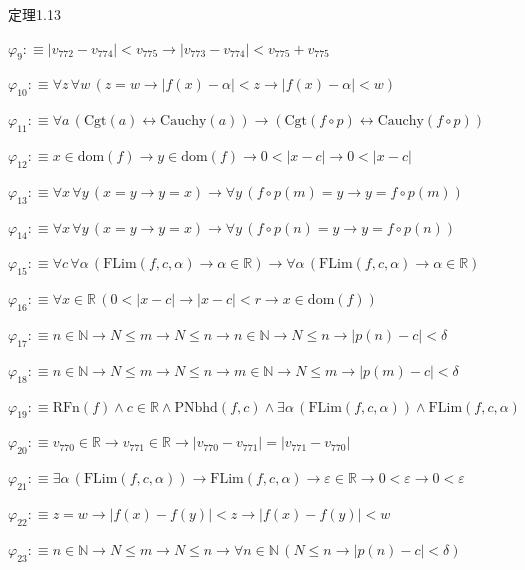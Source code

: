 \begin{fullproof}{定理1.13}
\begin{abbrevlist}
\item $\varphi_{9} :\equiv \lvert v_{772} - v_{774} \rvert < v_{775} \to \lvert v_{773} - v_{774} \rvert < v_{775} + v_{775}$
\item $\varphi_{10} :\equiv \forall z\,\forall w\,(z = w \to \lvert f(x) - \alpha \rvert < z \to \lvert f(x) - \alpha \rvert < w)$
\item $\varphi_{11} :\equiv \forall a\,(\mathrm{Cgt}(a) \leftrightarrow \mathrm{Cauchy}(a)) \to (\mathrm{Cgt}(f \circ p) \leftrightarrow \mathrm{Cauchy}(f \circ p))$
\item $\varphi_{12} :\equiv x \in \mathrm{dom}(f) \to y \in \mathrm{dom}(f) \to 0 < \lvert x - c \rvert \to 0 < \lvert x - c \rvert$
\item $\varphi_{13} :\equiv \forall x\,\forall y\,(x = y \to y = x) \to \forall y\,(f \circ p(m) = y \to y = f \circ p(m))$
\item $\varphi_{14} :\equiv \forall x\,\forall y\,(x = y \to y = x) \to \forall y\,(f \circ p(n) = y \to y = f \circ p(n))$
\item $\varphi_{15} :\equiv \forall c\,\forall \alpha\,(\mathrm{FLim}(f,c,\alpha) \to \alpha \in \mathbb{R}) \to \forall \alpha\,(\mathrm{FLim}(f,c,\alpha) \to \alpha \in \mathbb{R})$
\item $\varphi_{16} :\equiv \forall x \in \mathbb{R}\,(0 < \lvert x - c \rvert \to \lvert x - c \rvert < r \to x \in \mathrm{dom}(f))$
\item $\varphi_{17} :\equiv n \in \mathbb{N} \to N \leq m \to N \leq n \to n \in \mathbb{N} \to N \leq n \to \lvert p(n) - c \rvert < \delta$
\item $\varphi_{18} :\equiv n \in \mathbb{N} \to N \leq m \to N \leq n \to m \in \mathbb{N} \to N \leq m \to \lvert p(m) - c \rvert < \delta$
\item $\varphi_{19} :\equiv \mathrm{RFn}(f) \land c \in \mathbb{R} \land \mathrm{PNbhd}(f,c) \land \exists \alpha\,(\mathrm{FLim}(f,c,\alpha)) \land \mathrm{FLim}(f,c,\alpha)$
\item $\varphi_{20} :\equiv v_{770} \in \mathbb{R} \to v_{771} \in \mathbb{R} \to \lvert v_{770} - v_{771} \rvert = \lvert v_{771} - v_{770} \rvert$
\item $\varphi_{21} :\equiv \exists \alpha\,(\mathrm{FLim}(f,c,\alpha)) \to \mathrm{FLim}(f,c,\alpha) \to \varepsilon \in \mathbb{R} \to 0 < \varepsilon \to 0 < \varepsilon$
\item $\varphi_{22} :\equiv z = w \to \lvert f(x) - f(y) \rvert < z \to \lvert f(x) - f(y) \rvert < w$
\item $\varphi_{23} :\equiv n \in \mathbb{N} \to N \leq m \to N \leq n \to \forall n \in \mathbb{N}\,(N \leq n \to \lvert p(n) - c \rvert < \delta)$

\end{abbrevlist}
\end{fullproof}
